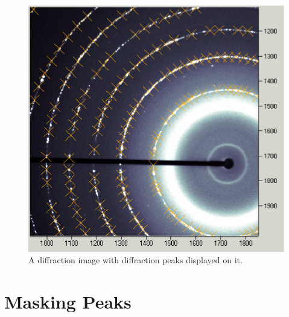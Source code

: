 \begin{figure}
    \centering
    \includegraphics[scale=.75]
    {figures/peaks_on_diffraction_image.eps}
    \caption{A diffraction image with diffraction peaks 
    displayed on it.}
    \label{peaks_on_diffraction_image}
\end{figure}

\section{Masking Peaks}

